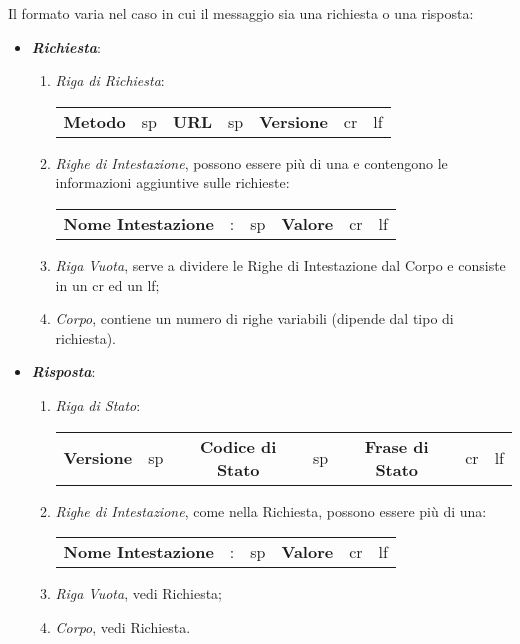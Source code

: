 \documentclass[a4paper]{article}
\begin{document}
				Il formato varia nel caso in cui il messaggio sia una richiesta o una risposta:
				\begin{itemize}
					\item \textbf{\emph{Richiesta}}: 
						\begin{enumerate}
							\item \emph{Riga di Richiesta}:\\
								\begin{tabular}{ccccccc}
									\textbf{Metodo} & sp & \textbf{URL} & sp & \textbf{Versione} & cr & lf\\
								\end{tabular}
							\item \emph{Righe di Intestazione}, possono essere più di una e contengono le informazioni aggiuntive sulle richieste:\\
								\begin{tabular}{cccccc}
									\textbf{Nome Intestazione} & : & sp & \textbf{Valore} & cr & lf\\
								\end{tabular}
							\item \emph{Riga Vuota}, serve a dividere le Righe di Intestazione dal Corpo e consiste in un cr ed un lf;
							\item \emph{Corpo}, contiene un numero di righe variabili (dipende dal tipo di richiesta).
						\end{enumerate}
					\item \textbf{\emph{Risposta}}:
						\begin{enumerate}
							\item \emph{Riga di Stato}:\\
								\begin{tabular}{ccccccc}
									\textbf{Versione} & sp & \textbf{Codice di Stato} & sp & \textbf{Frase di Stato} & cr & lf\\
								\end{tabular}
							\item \emph{Righe di Intestazione}, come nella Richiesta, possono essere più di una:\\
								\begin{tabular}{cccccc}
									\textbf{Nome Intestazione} & : & sp & \textbf{Valore} & cr & lf\\
								\end{tabular}
							\item \emph{Riga Vuota}, vedi Richiesta;
							\item \emph{Corpo}, vedi Richiesta.
						\end{enumerate}
				\end{itemize}
				
\end{document}
